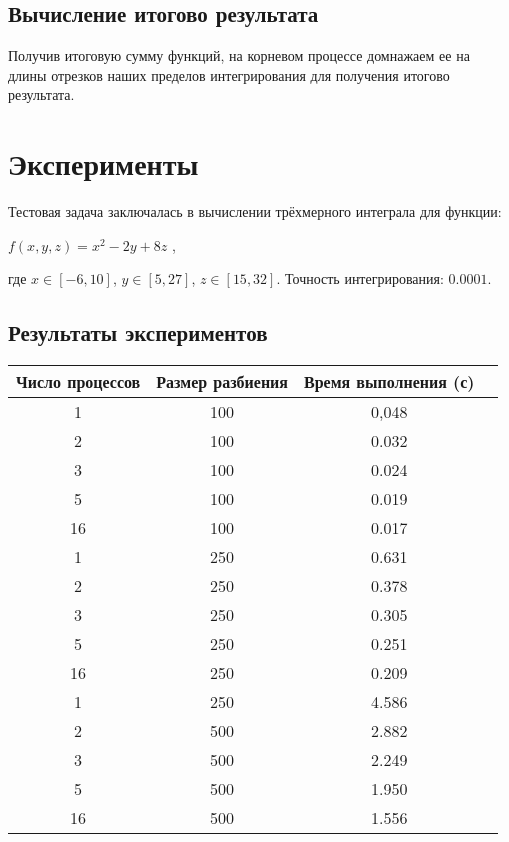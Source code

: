 \documentclass[12pt]{article}
\begin{document}
\subsection*{Вычисление итогово результата}
Получив итоговую сумму функций, на корневом процессе домнажаем ее на длины отрезков наших пределов интегрирования для получения итогово результата. 
\newpage

\section{Эксперименты}
Тестовая задача заключалась в вычислении трёхмерного интеграла для функции:\\
\begin{center}
$f(x,y,z) = x^2-2y+8z$ ,
\end{center}
 где $x \in [-6, 10]$, $y \in [5, 27]$, $z \in [15, 32]$. Точность интегрирования: $0.0001$.

\subsection*{Результаты экспериментов}
\begin{tabular}{|c|c|c|c|}
    \hline
    Число процессов & Размер разбиения      & Время выполнения (с) \\ \hline
    1               & 100                   & 0,048                   \\ \hline
    2               & 100                   & 0.032                  \\ \hline
    3               & 100                   & 0.024                 \\ \hline
    5               & 100                   & 0.019                   \\ \hline
    16              & 100                   & 0.017                  \\ \hline
    1               & 250                   & 0.631                    \\ \hline
    2               & 250                   & 0.378                   \\ \hline
    3               & 250                   & 0.305                  \\ \hline
    5               & 250                   & 0.251                    \\ \hline
    16              & 250                   & 0.209                    \\ \hline
    1               & 250                   & 4.586                    \\ \hline
    2               & 500                   & 2.882                    \\ \hline
    3               & 500                   & 2.249                    \\ \hline
    5               & 500                   & 1.950                   \\ \hline
    16              & 500                   & 1.556                    \\ \hline
\end{tabular}
\end{document}
